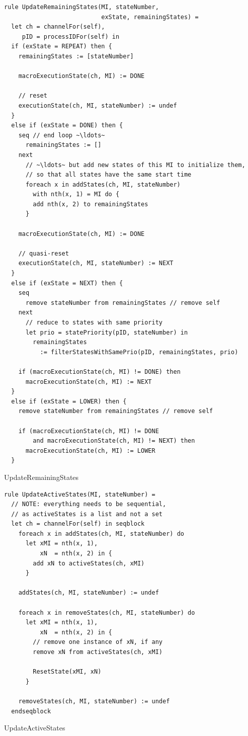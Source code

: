 \begin{listing}[H]
\begin{verbatim}
rule UpdateRemainingStates(MI, stateNumber,
                           exState, remainingStates) =
  let ch = channelFor(self),
     pID = processIDFor(self) in
  if (exState = REPEAT) then {
    remainingStates := [stateNumber]

    macroExecutionState(ch, MI) := DONE

    // reset
    executionState(ch, MI, stateNumber) := undef
  }
  else if (exState = DONE) then {
    seq // end loop ~\ldots~
      remainingStates := []
    next
      // ~\ldots~ but add new states of this MI to initialize them,
      // so that all states have the same start time
      foreach x in addStates(ch, MI, stateNumber)
        with nth(x, 1) = MI do {
        add nth(x, 2) to remainingStates
      }

    macroExecutionState(ch, MI) := DONE

    // quasi-reset
    executionState(ch, MI, stateNumber) := NEXT
  }
  else if (exState = NEXT) then {
    seq
      remove stateNumber from remainingStates // remove self
    next
      // reduce to states with same priority
      let prio = statePriority(pID, stateNumber) in
        remainingStates
          := filterStatesWithSamePrio(pID, remainingStates, prio)

    if (macroExecutionState(ch, MI) != DONE) then
      macroExecutionState(ch, MI) := NEXT
  }
  else if (exState = LOWER) then {
    remove stateNumber from remainingStates // remove self

    if (macroExecutionState(ch, MI) != DONE
        and macroExecutionState(ch, MI) != NEXT) then
      macroExecutionState(ch, MI) := LOWER
  }
\end{verbatim}
\caption{UpdateRemainingStates}
\label{lst:asm:UpdateRemainingStates}
\end{listing}




\begin{listing}[H]
\begin{verbatim}
rule UpdateActiveStates(MI, stateNumber) =
  // NOTE: everything needs to be sequential,
  // as activeStates is a list and not a set
  let ch = channelFor(self) in seqblock
    foreach x in addStates(ch, MI, stateNumber) do
      let xMI = nth(x, 1),
          xN  = nth(x, 2) in {
        add xN to activeStates(ch, xMI)
      }

    addStates(ch, MI, stateNumber) := undef

    foreach x in removeStates(ch, MI, stateNumber) do
      let xMI = nth(x, 1),
          xN  = nth(x, 2) in {
        // remove one instance of xN, if any
        remove xN from activeStates(ch, xMI)

        ResetState(xMI, xN)
      }

    removeStates(ch, MI, stateNumber) := undef
  endseqblock
\end{verbatim}
\caption{UpdateActiveStates}
\label{lst:asm:UpdateActiveStates}
\end{listing}




